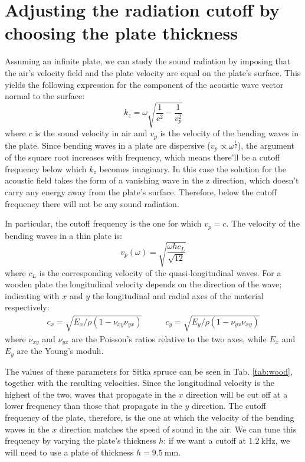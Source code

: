 \documentclass[a4paper]{article}
\begin{document}
\section{Adjusting the radiation cutoff by choosing the plate thickness}

Assuming an infinite plate, we can study the sound radiation by imposing that the air's velocity field and the plate velocity are equal on the plate's surface. This yields the following expression for the component of the acoustic wave vector normal to the surface:
$$ k_z = \omega \sqrt{\frac{1}{c^2} - \frac{1}{v_p^2}} $$
where $c$ is the sound velocity in air and $v_p$ is the velocity of the bending waves in the plate. Since bending waves in a plate are dispersive ($v_p \propto \omega^{\frac{1}{2}}$), the argument of the square root increases with frequency, which means there'll be a cutoff frequency below which $k_z$ becomes imaginary. In this case the solution for the acoustic field takes the form of a vanishing wave in the z direction, which doesn't carry any energy away from the plate's surface. Therefore, below the cutoff frequency there will not be any sound radiation.

In particular, the cutoff frequency is the one for which $v_p = c$. The velocity of the bending waves in a thin plate is:
$$ v_p(\omega) = \sqrt{\frac{\omega hc_L}{\sqrt{12}}} $$
where $c_L$ is the corresponding velocity of the quasi-longitudinal waves. For a wooden plate the longitudinal velocity depends on the direction of the wave; indicating with $x$ and $y$ the longitudinal and radial axes of the material respectively: 
\begin{align*}
	c_x = \sqrt{E_x /\rho(1 - \nu_{xy}\nu_{yx})} \qquad& c_y = \sqrt{E_y /\rho(1 - \nu_{yx}\nu_{xy})}
\end{align*}
where $\nu_{xy}$ and $\nu_{yx}$ are the Poisson's ratios relative to the two axes, while $E_x$ and $E_y$ are the Young's moduli.

The values of these parameters for Sitka spruce can be seen in Tab. \ref{tab:wood}, together with the resulting velocities. Since the longitudinal velocity is the highest of the two, waves that propagate in the $x$ direction will be cut off at a lower frequency than those that propagate in the $y$ direction. The cutoff frequency of the plate, therefore, is the one at which the velocity of the bending waves in the $x$ direction matches the speed of sound in the air. We can tune this frequency by varying the plate's thickness $h$: if we want a cutoff at $\SI{1.2}{\kilo\hertz}$, we will need to use a plate of thickness $h = \SI{9.5}{\milli\meter}$.
\end{document}
